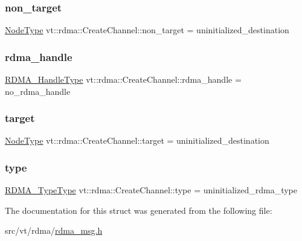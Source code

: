 \subsubsection{\texorpdfstring{non\+\_\+target}{non\_target}}
{\footnotesize\ttfamily \hyperlink{namespacevt_a866da9d0efc19c0a1ce79e9e492f47e2}{Node\+Type} vt\+::rdma\+::\+Create\+Channel\+::non\+\_\+target = uninitialized\+\_\+destination}

\mbox{\label{structvt_1_1rdma_1_1_create_channel_a27cb16b5aedbf0f2a905dc61fd89d783}} 
\subsubsection{\texorpdfstring{rdma\+\_\+handle}{rdma\_handle}}
{\footnotesize\ttfamily \hyperlink{namespacevt_a10442579ec4e7ebef223818e64bcf908}{R\+D\+M\+A\+\_\+\+Handle\+Type} vt\+::rdma\+::\+Create\+Channel\+::rdma\+\_\+handle = no\+\_\+rdma\+\_\+handle}

\mbox{\label{structvt_1_1rdma_1_1_create_channel_ad562afaf95db8f77426f698b207de63f}} 
\subsubsection{\texorpdfstring{target}{target}}
{\footnotesize\ttfamily \hyperlink{namespacevt_a866da9d0efc19c0a1ce79e9e492f47e2}{Node\+Type} vt\+::rdma\+::\+Create\+Channel\+::target = uninitialized\+\_\+destination}

\mbox{\label{structvt_1_1rdma_1_1_create_channel_a69ed66b06ab210ac3db0c17e76d11c19}} 
\subsubsection{\texorpdfstring{type}{type}}
{\footnotesize\ttfamily \hyperlink{namespacevt_1_1rdma_ac848e1d9da43db6294bd06f83e5d3946}{R\+D\+M\+A\+\_\+\+Type\+Type} vt\+::rdma\+::\+Create\+Channel\+::type = uninitialized\+\_\+rdma\+\_\+type}



The documentation for this struct was generated from the following file\+:\begin{DoxyCompactItemize}
\item 
src/vt/rdma/\hyperlink{rdma__msg_8h}{rdma\+\_\+msg.\+h}\end{DoxyCompactItemize}
